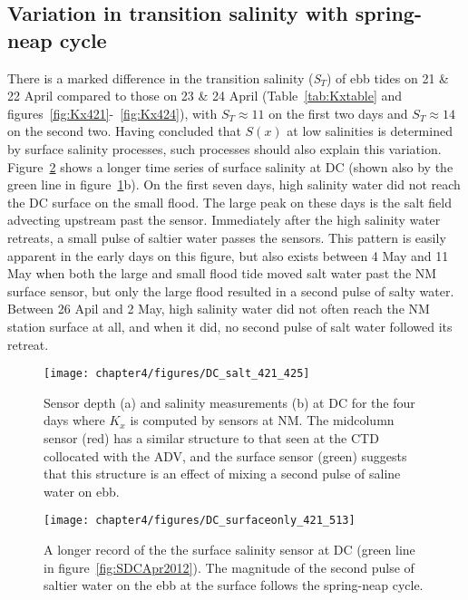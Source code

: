 \subsection{Variation in transition salinity with spring-neap cycle}
There is a marked difference in the transition salinity (\emph{S$_T$}) of ebb tides on 21 \& 22 April compared to those on 23 \& 24 April (Table~\ref{tab:Kxtable} and figures~\ref{fig:Kx421}-~\ref{fig:Kx424}), with $S_T\approx 11$ on the first two days and $S_T\approx 14$ on the second two. Having concluded that $S(x)$ at low salinities is determined by surface salinity processes, such processes should also explain this variation. Figure~\ref{fig:SsurfLT} shows a longer time series of surface salinity at DC (shown also by the green line in figure~\ref{fig:DC_salt_421_425}b). On the first seven days, high salinity water did not reach the DC surface on the small flood. The large peak on these days is the salt field advecting upstream past the sensor. Immediately after the high salinity water retreats, a small pulse of saltier water passes the sensors. This pattern is easily apparent in the early days on this figure, but also exists between 4 May and 11 May when both the large and small flood tide moved salt water past the NM surface sensor, but only the large flood resulted in a second pulse of salty water. Between 26 Apil and 2 May, high salinity water did not often reach the NM station surface at all, and when it did, no second pulse of salt water followed its retreat. 




\begin{figure}
	\texttt{[image: chapter4/figures/DC\_salt\_421\_425]}
	\caption{Sensor depth (a) and salinity measurements (b) at DC for the four days where $K_x$ is computed by sensors at NM. The midcolumn sensor (red) has a similar structure to that seen at the CTD collocated with the ADV, and the surface sensor (green) suggests that this structure is an effect of mixing a second pulse of saline water on ebb.} \label{fig:SDCApr2012} \label{fig:DC_salt_421_425}
\end{figure}


\begin{figure}
	\texttt{[image: chapter4/figures/DC\_surfaceonly\_421\_513]}
	\caption{A longer record of the the surface salinity sensor at DC (green line in figure~\ref{fig:SDCApr2012}). The magnitude of the second pulse of saltier water on the ebb at the surface follows the spring-neap cycle.} \label{fig:SsurfLT}
\end{figure}



